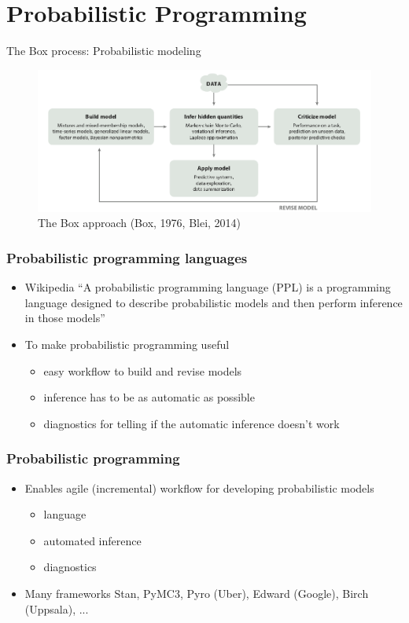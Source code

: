 \documentclass[10pt]{beamer}
\begin{document}
\section{Probabilistic Programming}
\frame{\sectionpage}


\begin{frame}{The Box process: Probabilistic modeling}

\begin{figure}
    \centering
    \includegraphics[width=1\textwidth]{figs/Boxs_loop.png}
    \caption{The Box approach (Box, 1976, Blei, 2014)}
\end{figure}
\end{frame}


\begin{frame}
\frametitle{Probabilistic programming languages}

  \begin{itemize}
  \item Wikipedia ``A probabilistic programming language (PPL) is a
    programming language designed to describe probabilistic models
    and then perform inference in those models''
    \pause
  \item To make probabilistic programming useful
    \begin{itemize}
    \item easy workflow to build and revise models
    \item inference has to be as automatic as possible
    \item diagnostics for telling if the automatic inference doesn't work
    \end{itemize}
  \end{itemize}
\end{frame}

\begin{frame}

\frametitle{Probabilistic programming}

  \begin{itemize}
  \item Enables agile (incremental) workflow for developing probabilistic models
    \begin{itemize}
    \item language
    \item automated inference
    \item diagnostics
    \end{itemize}
  \item Many frameworks
    Stan, PyMC3, Pyro (Uber), Edward (Google), Birch (Uppsala), ...
  \end{itemize}

\end{frame}
\end{document}
